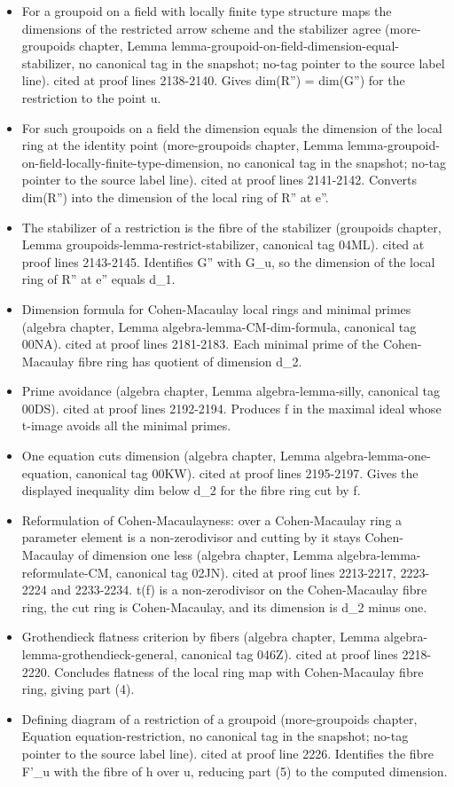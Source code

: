 \documentclass{stacks-project}
\theoremstyle{plain}
\theoremstyle{definition}
\theoremstyle{remark}
\numberwithin{equation}{subsection}
\begin{document}
\begin{itemize}
\item For a groupoid on a field with locally finite type structure maps the dimensions of the restricted arrow scheme and the stabilizer agree (more-groupoids chapter, Lemma lemma-groupoid-on-field-dimension-equal-stabilizer, no canonical tag in the snapshot; no-tag pointer to the source label line). cited at proof lines 2138-2140. Gives dim(R'') = dim(G'') for the restriction to the point u.
\item For such groupoids on a field the dimension equals the dimension of the local ring at the identity point (more-groupoids chapter, Lemma lemma-groupoid-on-field-locally-finite-type-dimension, no canonical tag in the snapshot; no-tag pointer to the source label line). cited at proof lines 2141-2142. Converts dim(R'') into the dimension of the local ring of R'' at e''.
\item The stabilizer of a restriction is the fibre of the stabilizer (groupoids chapter, Lemma groupoids-lemma-restrict-stabilizer, canonical tag 04ML). cited at proof lines 2143-2145. Identifies G'' with G\_u, so the dimension of the local ring of R'' at e'' equals d\_1.
\item Dimension formula for Cohen-Macaulay local rings and minimal primes (algebra chapter, Lemma algebra-lemma-CM-dim-formula, canonical tag 00NA). cited at proof lines 2181-2183. Each minimal prime of the Cohen-Macaulay fibre ring has quotient of dimension d\_2.
\item Prime avoidance (algebra chapter, Lemma algebra-lemma-silly, canonical tag 00DS). cited at proof lines 2192-2194. Produces f in the maximal ideal whose t-image avoids all the minimal primes.
\item One equation cuts dimension (algebra chapter, Lemma algebra-lemma-one-equation, canonical tag 00KW). cited at proof lines 2195-2197. Gives the displayed inequality dim below d\_2 for the fibre ring cut by f.
\item Reformulation of Cohen-Macaulayness: over a Cohen-Macaulay ring a parameter element is a non-zerodivisor and cutting by it stays Cohen-Macaulay of dimension one less (algebra chapter, Lemma algebra-lemma-reformulate-CM, canonical tag 02JN). cited at proof lines 2213-2217, 2223-2224 and 2233-2234. t(f) is a non-zerodivisor on the Cohen-Macaulay fibre ring, the cut ring is Cohen-Macaulay, and its dimension is d\_2 minus one.
\item Grothendieck flatness criterion by fibers (algebra chapter, Lemma algebra-lemma-grothendieck-general, canonical tag 046Z). cited at proof lines 2218-2220. Concludes flatness of the local ring map with Cohen-Macaulay fibre ring, giving part (4).
\item Defining diagram of a restriction of a groupoid (more-groupoids chapter, Equation equation-restriction, no canonical tag in the snapshot; no-tag pointer to the source label line). cited at proof line 2226. Identifies the fibre F'\_u with the fibre of h over u, reducing part (5) to the computed dimension.
\end{itemize}\medskip
\end{document}

